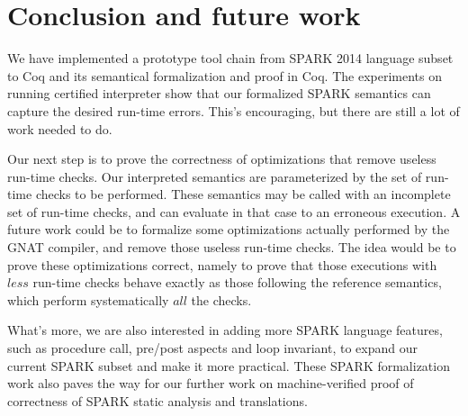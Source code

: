 \section{Conclusion and future work}
We have implemented a prototype tool chain from SPARK 2014 language subset to
Coq and its semantical formalization and proof in Coq. The experiments on running certified 
interpreter show that our formalized SPARK semantics can capture the desired run-time errors.
This's encouraging, but there are still a lot of work needed to do.

Our next step is to prove the correctness of optimizations that remove 
useless run-time checks. 
Our interpreted semantics are parameterized by the set of run-time 
checks to be performed. These semantics may be called with an 
incomplete set of run-time checks, and can evaluate in that case to an 
erroneous execution. A future work could be to formalize some 
optimizations actually performed by the GNAT compiler, and remove those useless 
run-time checks. The idea would be to prove 
these optimizations correct, namely to prove that those executions 
with $\mathit{less}$ run-time checks behave exactly as those following the 
reference semantics, which perform systematically $\mathit{all}$ the checks. 

What's more, we are also interested in adding more SPARK language features, 
such as procedure call, pre/post aspects and loop invariant, to expand our
current SPARK subset and make it more practical. These SPARK formalization work
also paves the way for our further work on machine-verified proof of correctness of
SPARK static analysis and translations.